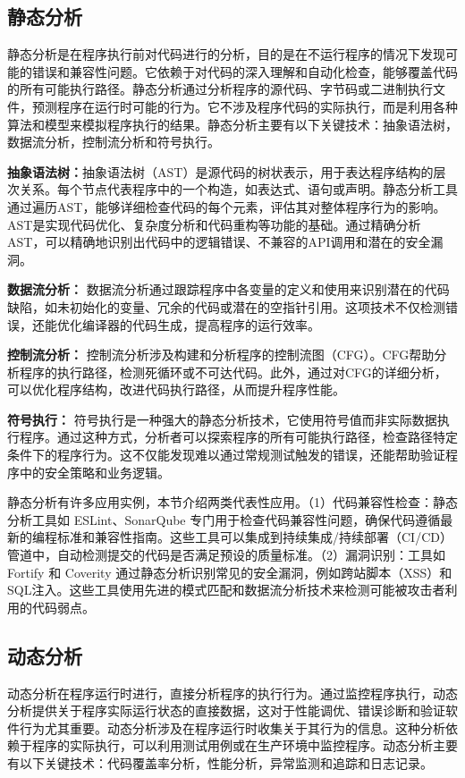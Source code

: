 \subsection{静态分析}
静态分析是在程序执行前对代码进行的分析，目的是在不运行程序的情况下发现可能的错误和兼容性问题。它依赖于对代码的深入理解和自动化检查，能够覆盖代码的所有可能执行路径。静态分析通过分析程序的源代码、字节码或二进制执行文件，预测程序在运行时可能的行为。它不涉及程序代码的实际执行，而是利用各种算法和模型来模拟程序执行的结果。静态分析主要有以下关键技术：抽象语法树，数据流分析，控制流分析和符号执行。

\textbf{抽象语法树：}抽象语法树（AST）是源代码的树状表示，用于表达程序结构的层次关系。每个节点代表程序中的一个构造，如表达式、语句或声明。静态分析工具通过遍历AST，能够详细检查代码的每个元素，评估其对整体程序行为的影响。AST是实现代码优化、复杂度分析和代码重构等功能的基础。通过精确分析AST，可以精确地识别出代码中的逻辑错误、不兼容的API调用和潜在的安全漏洞。

\textbf{数据流分析：} 数据流分析通过跟踪程序中各变量的定义和使用来识别潜在的代码缺陷，如未初始化的变量、冗余的代码或潜在的空指针引用。这项技术不仅检测错误，还能优化编译器的代码生成，提高程序的运行效率。

\textbf{控制流分析：} 控制流分析涉及构建和分析程序的控制流图（CFG）。CFG帮助分析程序的执行路径，检测死循环或不可达代码。此外，通过对CFG的详细分析，可以优化程序结构，改进代码执行路径，从而提升程序性能。

\textbf{符号执行：} 符号执行是一种强大的静态分析技术，它使用符号值而非实际数据执行程序。通过这种方式，分析者可以探索程序的所有可能执行路径，检查路径特定条件下的程序行为。这不仅能发现难以通过常规测试触发的错误，还能帮助验证程序中的安全策略和业务逻辑。

静态分析有许多应用实例，本节介绍两类代表性应用。（1）代码兼容性检查：静态分析工具如 ESLint、SonarQube 专门用于检查代码兼容性问题，确保代码遵循最新的编程标准和兼容性指南。这些工具可以集成到持续集成/持续部署（CI/CD）管道中，自动检测提交的代码是否满足预设的质量标准。（2）漏洞识别：工具如 Fortify 和 Coverity 通过静态分析识别常见的安全漏洞，例如跨站脚本（XSS）和SQL注入。这些工具使用先进的模式匹配和数据流分析技术来检测可能被攻击者利用的代码弱点。

\subsection{动态分析}
动态分析在程序运行时进行，直接分析程序的执行行为。通过监控程序执行，动态分析提供关于程序实际运行状态的直接数据，这对于性能调优、错误诊断和验证软件行为尤其重要。动态分析涉及在程序运行时收集关于其行为的信息。这种分析依赖于程序的实际执行，可以利用测试用例或在生产环境中监控程序。动态分析主要有以下关键技术：代码覆盖率分析，性能分析，异常监测和追踪和日志记录。


